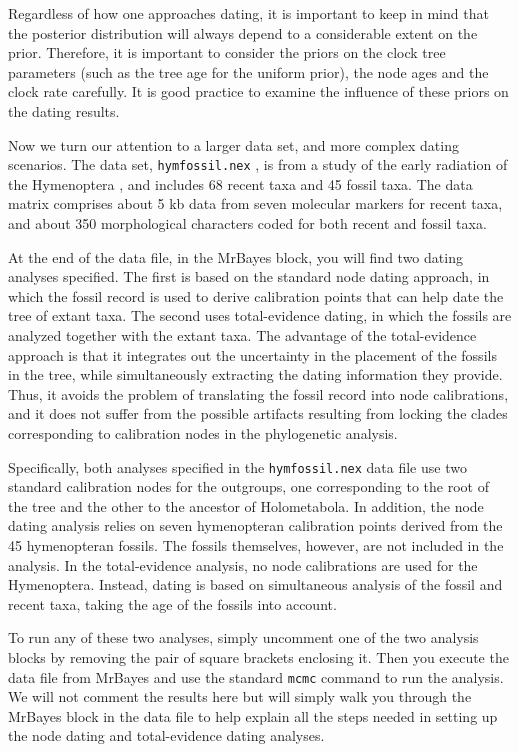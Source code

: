 \documentclass[12pt]{book}
\newcommand{\ttt}[1]{\texttt{#1} }
\begin{document}
Regardless of how one approaches dating, it is important to keep in mind that the posterior distribution will
always depend to a considerable extent on the prior. Therefore, it is important to consider the priors on
the clock tree parameters (such as the tree age for the uniform prior), the node ages and the clock rate
carefully. It is good practice to examine the influence of these priors on the dating results.

Now we turn our attention to a larger data set, and more complex dating scenarios. The data set,
\ttt{hymfossil.nex}, is from a study of the early radiation of the Hymenoptera
\citep{ronquist12b}, and includes 68 recent taxa and 45 fossil taxa. The data matrix comprises
about 5 kb data from seven molecular markers for recent taxa, and about 350 morphological
characters coded for both recent and fossil taxa.

At the end of the data file, in the MrBayes block, you will find two dating analyses specified.
The first is based on the standard node dating approach, in which the fossil record is used to
derive calibration points that can help date the tree of extant taxa. The second uses
total-evidence dating, in which the fossils are analyzed together with the extant taxa. The
advantage of the total-evidence approach is that it integrates out the uncertainty in the placement
of the fossils in the tree, while simultaneously extracting the dating information they provide.
Thus, it avoids the problem of translating the fossil record into node calibrations, and it does
not suffer from the possible artifacts resulting from locking the clades corresponding to
calibration nodes in the phylogenetic analysis.

Specifically, both analyses specified in the \ttt{hymfossil.nex} data file use two standard
calibration nodes for the outgroups, one corresponding to the root of the tree and the other to the
ancestor of Holometabola.  In addition, the node dating analysis relies on seven hymenopteran
calibration points derived from the 45 hymenopteran fossils. The fossils themselves, however, are
not included in the analysis.  In the total-evidence analysis, no node calibrations are used for
the Hymenoptera. Instead, dating is based on simultaneous analysis of the fossil and recent taxa,
taking the age of the fossils into account.

To run any of these two analyses, simply uncomment one of the two analysis blocks by removing the
pair of square brackets enclosing it. Then you execute the data file from MrBayes and use the
standard \ttt{mcmc} command to run the analysis. We will not comment the results here but will
simply walk you through the MrBayes block in the data file to help explain all the steps needed in
setting up the node dating and total-evidence dating analyses.
\end{document}
